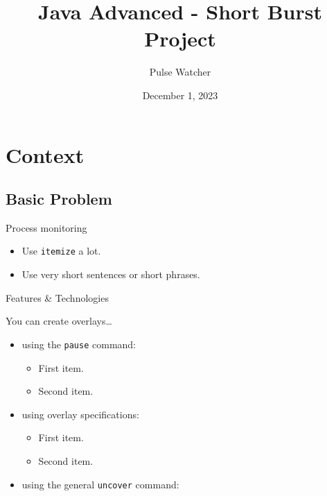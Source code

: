 \documentclass{beamer}
\title[Pulse Watcher]
{Java Advanced - Short Burst Project}
\subtitle
{Pulse Watcher}
\date{December 1, 2023}
\institute[Universities of Somewhere and Elsewhere]
{
  EHB\\
  Brussels}
\begin{document}
\begin{frame}
  \titlepage
\end{frame}





\section{Context}

\subsection{Basic Problem}

\begin{frame}{Process monitoring}
  \begin{itemize}
  \item
    Use \texttt{itemize} a lot.
  \item
    Use very short sentences or short phrases.
  \end{itemize}
\end{frame}

\begin{frame}{Features \& Technologies}

  You can create overlays\dots
  \begin{itemize}
  \item using the \texttt{pause} command:
    \begin{itemize}
    \item
      First item.
      \pause
    \item    
      Second item.
    \end{itemize}
  \item
    using overlay specifications:
    \begin{itemize}
    \item<3->
      First item.
    \item<4->
      Second item.
    \end{itemize}
  \item
    using the general \texttt{uncover} command:
    \begin{itemize}
    \end{itemize}
  \end{itemize}
\end{frame}
\end{document}
